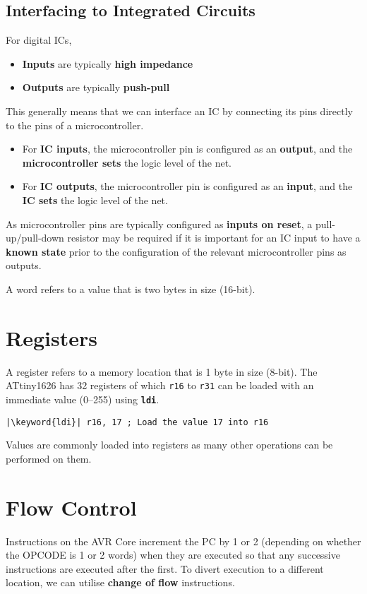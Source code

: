 \documentclass[a4paper]{report}
\newcommand{\keyword}[1]{\textcolor[rgb]{0.00,0.50,0.00}{\textbf{#1}}}
\newcommand{\keywordinline}[1]{\textcolor[rgb]{0.00,0.50,0.00}{\textbf{\texttt{#1}}}}
\begin{document}
\subsection{Interfacing to Integrated Circuits}
For digital ICs,
\begin{itemize}
    \item \textbf{Inputs} are typically \textbf{high impedance}
    \item \textbf{Outputs} are typically \textbf{push-pull}
\end{itemize}
This generally means that we can interface an IC by connecting its pins directly to the pins of a microcontroller.
\begin{itemize}
    \item For \textbf{IC inputs}, the microcontroller pin is configured
          as an \textbf{output}, and the \textbf{microcontroller sets}
          the logic level of the net.
    \item For \textbf{IC outputs}, the microcontroller pin is
          configured as an \textbf{input}, and the \textbf{IC sets} the
          logic level of the net.
\end{itemize}
As microcontroller pins are typically configured as \textbf{inputs on reset}, a
pull-up/pull-down resistor may be required if it is important for an IC input to
have a \textbf{known state} prior to the configuration of the relevant microcontroller pins as outputs.
\begin{definition}[Word]
    A word refers to a value that is two bytes in size (16-bit).
\end{definition}
\section{Registers}
A register refers to a memory location that is 1 byte in size (8-bit).
The ATtiny1626 has 32 registers of which \texttt{r16} to
\texttt{r31} can be loaded with an immediate value
(\numrange{0}{255}) using \keywordinline{ldi}.
\begin{verbatim}
|\keyword{ldi}| r16, 17 ; Load the value 17 into r16
\end{verbatim}
Values are commonly loaded into registers as many other operations can
be performed on them.
\section{Flow Control}
Instructions on the AVR Core increment the PC by 1 or 2 (depending on
whether the OPCODE is 1 or 2 words) when they are executed so that any
successive instructions are executed after the first. To divert
execution to a different location, we can utilise \textbf{change of
flow} instructions.
\end{document}
